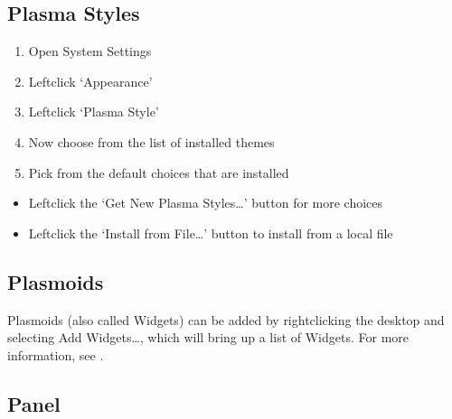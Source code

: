 \documentclass[letterpaper,10pt,english]{sphinxmanual}
\begin{document}
\subsection{Plasma Styles}
\label{\detokenize{docs/desktop-guide/advanced:plasma-styles}}\begin{enumerate}
%
\item {} 
\sphinxAtStartPar
Open System Settings

\item {} 
\sphinxAtStartPar
Left\sphinxhyphen{}click ‘Appearance’

\item {} 
\sphinxAtStartPar
Left\sphinxhyphen{}click ‘Plasma Style’

\item {} 
\sphinxAtStartPar
Now choose from the list of installed themes

\item {} 
\sphinxAtStartPar
Pick from the default choices that are installed

\end{enumerate}
\begin{itemize}
\item {} 
\sphinxAtStartPar
Left\sphinxhyphen{}click the ‘Get New Plasma Styles…’ button for more choices

\item {} 
\sphinxAtStartPar
Left\sphinxhyphen{}click the ‘Install from File…’ button to install from a local file

\end{itemize}


\subsection{Plasmoids}
\label{\detokenize{docs/desktop-guide/advanced:plasmoids}}
\sphinxAtStartPar
Plasmoids (also called Widgets) can be added by right\sphinxhyphen{}clicking the desktop and selecting Add Widgets…, which will bring up a list of Widgets. For more information, see .


\subsection{Panel}
\label{\detokenize{docs/desktop-guide/advanced:panel}}\label{\detokenize{docs/desktop-guide/advanced:id1}}
\end{document}
